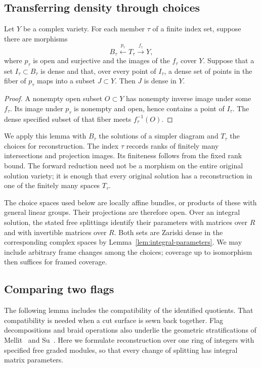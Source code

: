 \subsection{Transferring density through choices}

\begin{lemma}\label{lem:density-transfer}
Let $Y$ be a complex variety.  For each member $\tau$ of a finite index
set, suppose there are morphisms
\[
 B_\tau\xleftarrow{\ p_\tau\ }T_\tau
 \xrightarrow{\ f_\tau\ }Y,
\]
where $p_\tau$ is open and surjective and the images of the $f_\tau$
cover $Y$.  Suppose that a set $I_\tau\subset B_\tau$ is dense and that,
over every point of $I_\tau$, a dense set of points in the fiber of
$p_\tau$ maps into a subset $J\subset Y$.  Then $J$ is dense in $Y$.
\end{lemma}

\begin{proof}
A nonempty open subset $O\subset Y$ has nonempty inverse image under
some $f_\tau$.  Its image under $p_\tau$ is nonempty and open, hence
contains a point of $I_\tau$.  The dense specified subset of that fiber
meets $f_\tau^{-1}(O)$.
\end{proof}

We apply this lemma with $B_\tau$ the solutions of a simpler diagram
and $T_\tau$ the choices for reconstruction.  The index $\tau$ records
ranks of finitely many intersections and projection images.  Its
finiteness follows from the fixed rank bound.  The forward reduction
need not be a morphism on the entire original solution variety; it is
enough that every original solution has a reconstruction in one of the
finitely many spaces $T_\tau$.

The choice spaces used below are locally affine bundles, or products
of these with general linear groups.  Their projections are therefore
open.  Over an integral solution, the stated free splittings identify
their parameters with matrices over $R$ and with invertible matrices
over $R$.  Both sets are Zariski dense in the corresponding complex
spaces by Lemma~\ref{lem:integral-parameters}.
We may include arbitrary frame changes among the choices;
coverage up to isomorphism then suffices for framed coverage.

\subsection{Comparing two flags}

The following lemma includes the compatibility of the identified
quotients.  That compatibility is needed when a cut surface is sewn
back together.
Flag decompositions and braid operations also underlie the geometric
stratifications of Mellit~\cite[Theorem~1.2]{Mellit} and
Su~\cite[Theorem~0.5]{Su}.
Here we formulate reconstruction over one ring of integers with
specified free graded modules, so that every change of splitting
has integral matrix parameters.


